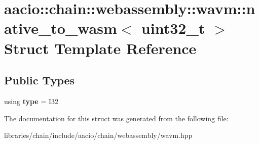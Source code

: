 \hypertarget{structaacio_1_1chain_1_1webassembly_1_1wavm_1_1native__to__wasm_3_01uint32__t_01_4}{}\section{aacio\+:\+:chain\+:\+:webassembly\+:\+:wavm\+:\+:native\+\_\+to\+\_\+wasm$<$ uint32\+\_\+t $>$ Struct Template Reference}
\label{structaacio_1_1chain_1_1webassembly_1_1wavm_1_1native__to__wasm_3_01uint32__t_01_4}
\subsection*{Public Types}
\begin{DoxyCompactItemize}
\item 
\mbox{\label{structaacio_1_1chain_1_1webassembly_1_1wavm_1_1native__to__wasm_3_01uint32__t_01_4_a3aebfbef1dd7ef41b2bc60cc4dbf77a0}} 
using {\bfseries type} = I32
\end{DoxyCompactItemize}


The documentation for this struct was generated from the following file\+:\begin{DoxyCompactItemize}
\item 
libraries/chain/include/aacio/chain/webassembly/wavm.\+hpp\end{DoxyCompactItemize}

